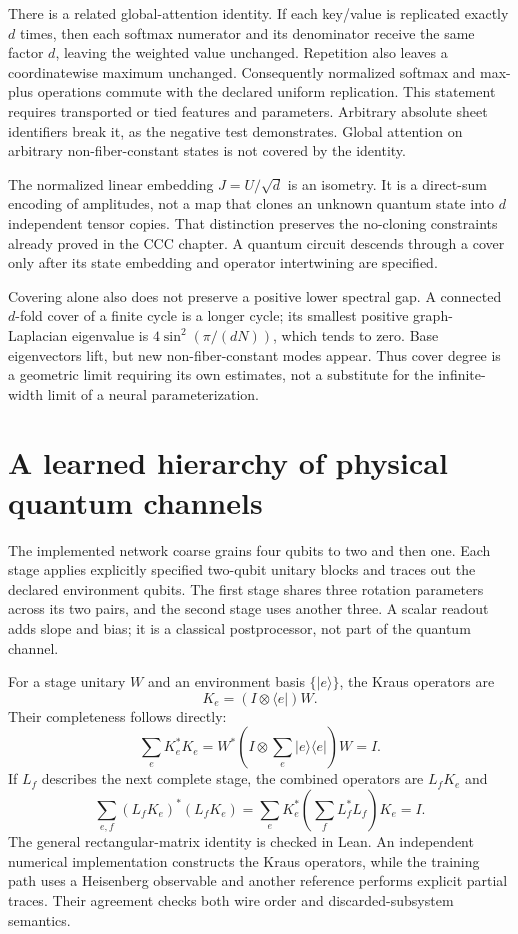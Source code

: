 There is a related global-attention identity. If each key/value is replicated exactly $d$ times, then each softmax numerator and its denominator receive the same factor $d$, leaving the weighted value unchanged. Repetition also leaves a coordinatewise maximum unchanged. Consequently normalized softmax and max-plus operations commute with the declared uniform replication. This statement requires transported or tied features and parameters. Arbitrary absolute sheet identifiers break it, as the negative test demonstrates. Global attention on arbitrary non-fiber-constant states is not covered by the identity.

The normalized linear embedding $J=U/\sqrt d$ is an isometry. It is a direct-sum encoding of amplitudes, not a map that clones an unknown quantum state into $d$ independent tensor copies. That distinction preserves the no-cloning constraints already proved in the CCC chapter. A quantum circuit descends through a cover only after its state embedding and operator intertwining are specified.

Covering alone also does not preserve a positive lower spectral gap. A connected $d$-fold cover of a finite cycle is a longer cycle; its smallest positive graph-Laplacian eigenvalue is $4\sin^2(\pi/(dN))$, which tends to zero. Base eigenvectors lift, but new non-fiber-constant modes appear. Thus cover degree is a geometric limit requiring its own estimates, not a substitute for the infinite-width limit of a neural parameterization.

\section{A learned hierarchy of physical quantum channels}

The implemented network coarse grains four qubits to two and then one. Each stage applies explicitly specified two-qubit unitary blocks and traces out the declared environment qubits. The first stage shares three rotation parameters across its two pairs, and the second stage uses another three. A scalar readout adds slope and bias; it is a classical postprocessor, not part of the quantum channel.

For a stage unitary $W$ and an environment basis $\{|e\rangle\}$, the Kraus operators are
\[
 K_e=(I\otimes\langle e|)W.
\]
Their completeness follows directly:
\[
 \sum_eK_e^*K_e
 =W^*\left(I\otimes\sum_e|e\rangle\langle e|\right)W=I.
\]
If $L_f$ describes the next complete stage, the combined operators are $L_fK_e$ and
\[
 \sum_{e,f}(L_fK_e)^*(L_fK_e)
 =\sum_eK_e^*\left(\sum_fL_f^*L_f\right)K_e=I.
\]
The general rectangular-matrix identity is checked in Lean. An independent numerical implementation constructs the Kraus operators, while the training path uses a Heisenberg observable and another reference performs explicit partial traces. Their agreement checks both wire order and discarded-subsystem semantics.

